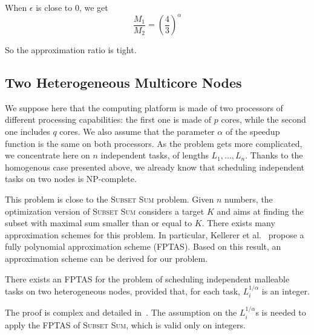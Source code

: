 \documentclass{llncs}
\newcommand{\frtrd}{\ensuremath{\left(\frac{4}{3}\right)^\alpha}}
\newif\iflong
\begin{document}
When $\epsilon$ is close to $0$, we get
$$\frac{M_1}{M_2} = \frtrd$$

So the approximation ratio is tight. 
\fi 

\subsection{Two Heterogeneous Multicore Nodes}
\label{sec:dist-het}

We suppose here that the computing platform is made of two processors
of different processing capabilities: the first one is made of $p$
cores, while the second one includes $q$ cores. We also assume that
the parameter $\alpha$ of the speedup function is the same on both
processors. As the problem gets more complicated, we concentrate here
on $n$ independent tasks,  of lengths $L_1, ..., L_n$. Thanks to the
homogenous case presented above, we already know that scheduling
independent tasks on two nodes is NP-complete.

\iflong \else This problem is close to the \textsc{Subset Sum} problem. Given $n$
numbers, the optimization version of \textsc{Subset Sum} considers a
target $K$ and aims at finding the subset with maximal sum smaller
than or equal to $K$.  There exists many approximation schemes for
this problem. In particular, Kellerer et
al.~\cite{kellerer2003efficient} propose a fully polynomial
approximation scheme (FPTAS). Based on this result, an approximation
scheme can be derived for our problem.
\begin{theorem}
  There exists an FPTAS for the problem of scheduling independent
  malleable tasks on two heterogeneous nodes, provided that, for each
  task, $L_i^{1/\alpha}$ is an integer.
\end{theorem}

The proof is complex and detailed in~\cite{RR-ipdps-2014}. The
assumption on the $L_i^{1/\alpha}$s is needed to apply the FPTAS of
\textsc{Subset Sum}, which is valid only on integers.
\fi 
\end{document}
